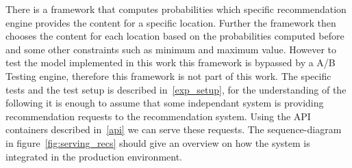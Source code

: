 
There is a framework that computes probabilities which specific recommendation engine provides the content for a specific location.
Further the framework then chooses the content for each location based on the probabilities computed before and some other constraints such as minimum and maximum value.
However to test the model implemented in this work this framework is bypassed by a A/B Testing engine, therefore this framework is not part of this work.
The specific tests and the test setup is described in~\ref{exp_setup}, for the understanding of the following it is enough to assume that some independant system is providing recommendation requests to the recommendation system.
Using the API containers described in~\ref{api} we can serve these requests.
The sequence-diagram in figure~\ref{fig:serving_recs} should give an overview on how the system is integrated in the production environment.

